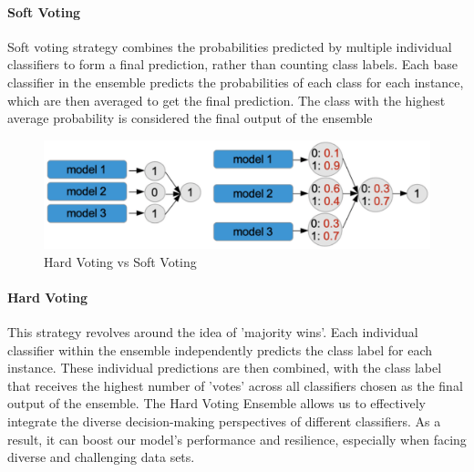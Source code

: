 \paragraph{Soft Voting}
Soft voting strategy combines the probabilities predicted by multiple individual classifiers to form a final prediction, rather than counting class labels. Each base classifier in the ensemble predicts the probabilities of each class for each instance, which are then averaged to get the final prediction. The class with the highest average probability is considered the final output of the ensemble
\begin{figure}
    \centering
    \includegraphics[scale=.4]{figures/voting.png}
    \caption{Hard Voting vs Soft Voting}
    \label{fig:voting}
\end{figure}
\paragraph{Hard Voting}
This strategy revolves around the idea of 'majority wins'. Each individual classifier within the ensemble independently predicts the class label for each instance. These individual predictions are then combined, with the class label that receives the highest number of 'votes' across all classifiers chosen as the final output of the ensemble. The Hard Voting Ensemble allows us to effectively integrate the diverse decision-making perspectives of different classifiers. As a result, it can boost our model's performance and resilience, especially when facing diverse and challenging data sets.

